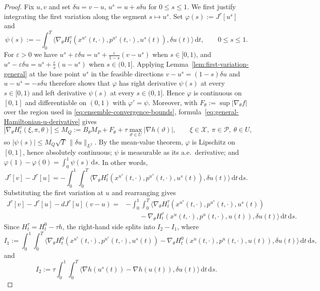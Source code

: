 \documentclass[10pt,a4paper]{amsart}
\newcommand{\dd}{\mathrm{d}}
\begin{document}
\begin{proof}
Fix $u,v$ and set $\delta u=v-u$, $u^s=u+s\delta u$ for
$0\le s\le1$.
We first justify integrating the first variation along the
segment $s\mapsto u^s$. Set $\varphi(s):=J^\tau[u^s]$ and
\[
\psi(s):=-\int_0^T
\langle \nabla_\theta H_t^\tau(x^{u^s}(t,\cdot),p^{u^s}(t,\cdot),u^s(t)),\delta u(t)\rangle\,\dd t,
\qquad 0\le s\le1.
\]
For $\varepsilon>0$ we have
$u^s+\varepsilon\delta u=u^s+\frac{\varepsilon}{1-s}(v-u^s)$ when
$s\in[0,1)$, and
$u^s-\varepsilon\delta u=u^s+\frac{\varepsilon}{s}(u-u^s)$ when
$s\in(0,1]$. Applying Lemma~\ref{lem:first-variation-general} at the
base point $u^s$ in the feasible directions $v-u^s=(1-s)\delta u$ and
$u-u^s=-s\delta u$ therefore shows that $\varphi$ has right derivative
$\psi(s)$ at every $s\in[0,1)$ and left derivative $\psi(s)$ at every
$s\in(0,1]$. Hence $\varphi$ is continuous on $[0,1]$ and
differentiable on $(0,1)$ with $\varphi'=\psi$. Moreover, with
$F_\theta:=\sup|\nabla_\theta f|$ over the region used in
\eqref{eq:ensemble-convergence-bounds},
formula~\eqref{eq:general-Hamiltonian-u-derivative} gives
\[
|\nabla_\theta H_t^\tau(\xi,\pi,\theta)|
\le M_Q:=B_\theta M_P+F_\theta+\tau\max_{\vartheta\in U}|\nabla h(\vartheta)|,
\qquad \xi\in\mathcal X,\ \pi\in\mathcal P,\ \theta\in U,
\]
so $|\psi(s)|\le M_Q\sqrt T\,\|\delta u\|_{L^2}$. By the mean-value
theorem, $\varphi$ is Lipschitz on $[0,1]$, hence absolutely
continuous; $\psi$ is measurable as its a.e.\ derivative; and
$\varphi(1)-\varphi(0)=\int_0^1\psi(s)\,\dd s$. In other words,
\begin{equation}
\label{eq:J-segment-integral}
J^\tau[v]-J^\tau[u]=-\int_0^1\int_0^T
\langle \nabla_\theta H_t^\tau(x^{u^s}(t,\cdot),p^{u^s}(t,\cdot),u^s(t)),\delta u(t)\rangle\,\dd t\,\dd s.
\end{equation}
Substituting the first variation at $u$ and rearranging gives
\begin{align*}
J^\tau[v]-J^\tau[u]-dJ^\tau[u](v-u) = &-\int_0^1\int_0^T
\langle \nabla_\theta H_t^\tau(x^{u^s}(t,\cdot),p^{u^s}(t,\cdot),u^s(t))\\
&\qquad-\nabla_\theta H_t^\tau(x^u(t,\cdot),p^u(t,\cdot),u(t)),\delta u(t)\rangle\,\dd t\,\dd s.
\end{align*}
Since $H_t^\tau=H_t^0-\tau h$, the right-hand side splits into $I_2 -I_1$, where
\[
I_1 := \int_0^1\int_0^T
\langle \nabla_\theta H_t^0(x^{u^s}(t,\cdot),p^{u^s}(t,\cdot),u^s(t))-\nabla_\theta H_t^0(x^u(t,\cdot),p^u(t,\cdot),u(t)),\delta u(t)\rangle\,\dd t\,\dd s,
\]
and
\[
I_2 := \tau \int_0^1\int_0^T
\langle \nabla h(u^s(t)) - \nabla h(u(t)), \delta u(t) \rangle \, \dd t \, \dd s.
\]
\end{proof}
\end{document}
